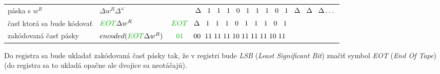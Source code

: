 \documentclass[11pt,a4paper]{article}
\newcommand{\green}[1]{\textcolor{OliveGreen}{#1}}
\begin{document}
\begin{center}
    \begin{tabular}{l|l|l}
        páska s $w^R$ & $\Delta w^R \Delta^\omega$ & $\hspace{11.75mm} \Delta \hspace{3mm} 1 \hspace{3mm} 1 \hspace{3mm} 1 \hspace{3mm} 0 \hspace{3mm} 1 \hspace{3mm} 1 \hspace{3mm} 1 \hspace{3mm} 0 \hspace{3mm} 1 \hspace{3mm} \Delta \hspace{3mm} \Delta \hspace{3mm} \Delta \dots$ \\
        časť ktorá sa bude kódovať & $\green{EOT} \Delta w^R$ & $ \green{EOT} \hspace{3mm} \Delta \hspace{3mm} 1 \hspace{3mm} 1 \hspace{3mm} 1 \hspace{3mm} 0 \hspace{3mm} 1 \hspace{3mm} 1 \hspace{3mm} 1 \hspace{3mm} 0 \hspace{3mm} 1$ \\
        zakódovaná časť pásky & $encoded(\green{EOT} \Delta w^R)$ & $\hspace{2.5mm} \green{01} \hspace{5mm} 00 \hspace{2mm} 11 \hspace{1mm} 11 \hspace{1mm} 11 \hspace{1mm} 10 \hspace{1mm} 11 \hspace{1mm} 11 \hspace{1mm} 11 \hspace{1mm} 10 \hspace{1mm} 11$
    \end{tabular}
\end{center}

Do registra sa bude ukladať zakódovaná časť pásky tak, že v registri bude \textit{LSB} (\textit{Least Significant Bit}) značiť symbol \green{\textit{EOT}} (\textit{End Of Tape}) (do registra sa to ukladá opačne ale dvojice sa neotáčajú).
\end{document}
